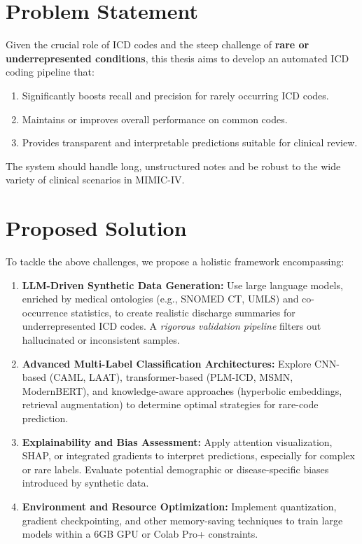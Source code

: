 \section{Problem Statement}
Given the crucial role of ICD codes and the steep challenge of \textbf{rare or underrepresented conditions}, this thesis aims to develop an automated ICD coding pipeline that:
\begin{enumerate}
    \item Significantly boosts recall and precision for rarely occurring ICD codes.
    \item Maintains or improves overall performance on common codes.
    \item Provides transparent and interpretable predictions suitable for clinical review.
\end{enumerate}
The system should handle long, unstructured notes and be robust to the wide variety of clinical scenarios in MIMIC-IV.

\section{Proposed Solution}
To tackle the above challenges, we propose a holistic framework encompassing:
\begin{enumerate}
    \item \textbf{LLM-Driven Synthetic Data Generation:} Use large language models, enriched by medical ontologies (e.g., SNOMED CT, UMLS) and co-occurrence statistics, to create realistic discharge summaries for underrepresented ICD codes. A \emph{rigorous validation pipeline} filters out hallucinated or inconsistent samples.
    \item \textbf{Advanced Multi-Label Classification Architectures:} Explore CNN-based (CAML, LAAT), transformer-based (PLM-ICD, MSMN, ModernBERT), and knowledge-aware approaches (hyperbolic embeddings, retrieval augmentation) to determine optimal strategies for rare-code prediction.
    \item \textbf{Explainability and Bias Assessment:} Apply attention visualization, SHAP, or integrated gradients to interpret predictions, especially for complex or rare labels. Evaluate potential demographic or disease-specific biases introduced by synthetic data.
    \item \textbf{Environment and Resource Optimization:} Implement quantization, gradient checkpointing, and other memory-saving techniques to train large models within a 6GB GPU or Colab Pro+ constraints.
\end{enumerate}

